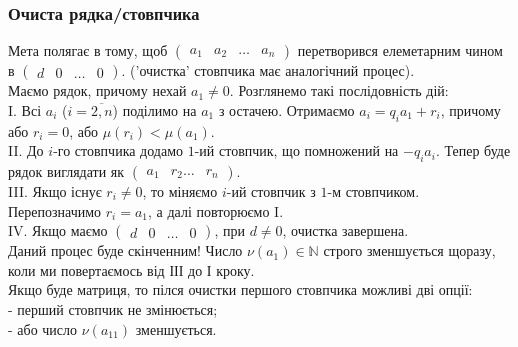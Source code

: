 \documentclass[a4paper, 10pt]{article}
\theoremstyle{theoremdd}
\theoremstyle{theoremdd}
\theoremstyle{theoremdd}
\theoremstyle{theoremdd}
\theoremstyle{theoremdd}
\theoremstyle{theoremdd}
\theoremstyle{theoremdd}
\theoremstyle{theoremdd}
\theoremstyle{theoremdd}
\theoremstyle{theoremdd}
\theoremstyle{theoremdd}
\theoremstyle{theoremdd}
\theoremstyle{theoremdd}
\theoremstyle{theoremdd}
\theoremstyle{theoremdd}
\begin{document}
\subsubsection*{Очиста рядка/стовпчика}
Мета полягає в тому, щоб $\begin{pmatrix}
a_{1} & a_2 & \dots & a_n
\end{pmatrix}$ перетворився елеметарним чином в $\begin{pmatrix}
d & 0 & \dots & 0
\end{pmatrix}$. ('очистка' стовпчика має аналогічний процес).\\
Маємо рядок, причому нехай $a_1 \neq 0$. Розглянемо такі послідовність дій:\\
I. Всі $a_i$ ($i = \overline{2,n}$) поділимо на $a_1$ з остачею. Отримаємо $a_i = q_i a_1 + r_i$, причому або $r_i = 0$, або $\mu(r_i) < \mu(a_1)$.\\
II. До $i$-го стовпчика додамо $1$-ий стовпчик, що помножений на $-q_ia_i$. Тепер буде рядок виглядати як $\begin{pmatrix}
a_1 & r_2 \dots & r_n
\end{pmatrix}$.\\
III. Якщо існує $r_i \neq 0$, то міняємо $i$-ий стовпчик з $1$-м стовпчиком. Перепозначимо $r_i = a_1$, а далі повторюємо I.\\
IV. Якщо маємо $\begin{pmatrix}
d & 0 & \dots & 0
\end{pmatrix}$, при $d \neq 0$, очистка завершена.
\bigskip \\
Даний процес буде скінченним! Число $\nu(a_1) \in \mathbb{N}$ строго зменшується щоразу, коли ми повертаємось від ІІІ до І кроку.\\
Якщо буде матриця, то пілся очистки першого стовпчика можливі дві опції:\\
- перший стовпчик не змінюється;\\
- або число $\nu(a_{11})$ зменшується.
\end{document}
